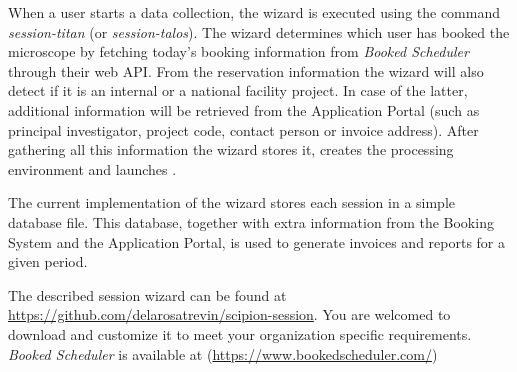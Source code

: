 
When a user starts a data collection, the wizard is executed using the command \textit{session-titan} (or \textit{session-talos}). The wizard determines which user has booked the microscope by fetching today's booking information from \emph{Booked Scheduler} through their web API. From the reservation information the wizard will also detect if it is an internal or a national facility project. 
In case of the latter, additional information will be retrieved from the Application Portal (such as principal investigator, project code, contact person or invoice address). After gathering all this information the wizard stores it, creates the processing environment and launches \scipion. %

The current implementation of the wizard stores each session in a simple database file. This database, together with extra information from the Booking System and the Application Portal, is used to generate invoices and reports for a given period. %

The described session wizard can be found at  \url{https://github.com/delarosatrevin/scipion-session}. You are welcomed to download and customize it to meet your organization specific requirements. \emph{Booked Scheduler} is available at (\url{https://www.bookedscheduler.com/})



